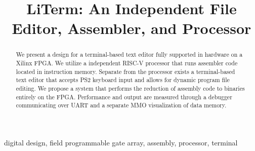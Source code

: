 \documentclass[conference]{IEEEtran}
\begin{document}
\title{LiTerm: An Independent File Editor, Assembler, and Processor}

\author{


\and


\and

}

\maketitle

\begin{abstract}
  We present a design for a terminal-based text editor fully supported in hardware on a Xilinx FPGA. We utilize a independent RISC-V processor that runs assembler code located in instruction memory. Separate from the processor exists a terminal-based text editor that accepts PS2 keyboard input and allows for dynamic program file editing. We propose a system that performs the reduction of assembly code to binaries entirely on the FPGA. Performance and output are measured through a debugger communicating over UART and a separate MMO visualization of data memory.
\end{abstract}

\begin{IEEEkeywords}
digital design, field programmable gate array, assembly, processor, terminal
\end{IEEEkeywords}
\end{document}
